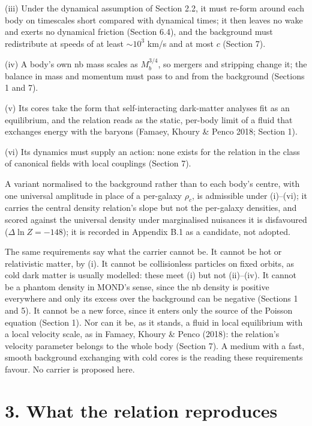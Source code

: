 \documentclass[
  10pt,
]{article}
\begin{document}
(iii) Under the dynamical assumption of Section 2.2, it must re-form around each body on timescales short compared with dynamical times; it then leaves no wake and exerts no dynamical friction (Section 6.4), and the background must redistribute at speeds of at least $\sim10^3$ km/s and at most $c$ (Section 7).

(iv) A body's own nb mass scales as $M_b^{3/4}$, so mergers and stripping change it; the balance in mass and momentum must pass to and from the background (Sections 1 and 7).

(v) Its cores take the form that self-interacting dark-matter analyses fit as an equilibrium, and the relation reads as the static, per-body limit of a fluid that exchanges energy with the baryons (Famaey, Khoury \& Penco 2018; Section 1).

(vi) Its dynamics must supply an action: none exists for the relation in the class of canonical fields with local couplings (Section 7).

A variant normalised to the background rather than to each body's centre, with one universal amplitude in place of a per-galaxy $\rho_c$, is admissible under (i)--(vi); it carries the central density relation's slope but not the per-galaxy densities, and scored against the universal density under marginalised nuisances it is disfavoured ($\Delta\ln Z=-148$); it is recorded in Appendix B.1 as a candidate, not adopted.

The same requirements say what the carrier cannot be. It cannot be hot or relativistic matter, by (i). It cannot be collisionless particles on fixed orbits, as cold dark matter is usually modelled: these meet (i) but not (ii)--(iv). It cannot be a phantom density in MOND's sense, since the nb density is positive everywhere and only its excess over the background can be negative (Sections 1 and 5). It cannot be a new force, since it enters only the source of the Poisson equation (Section 1). Nor can it be, as it stands, a fluid in local equilibrium with a local velocity scale, as in Famaey, Khoury \& Penco (2018): the relation's velocity parameter belongs to the whole body (Section 7). A medium with a fast, smooth background exchanging with cold cores is the reading these requirements favour. No carrier is proposed here.

\section{3. What the relation reproduces}\label{what-the-law-reproduces}
\end{document}
